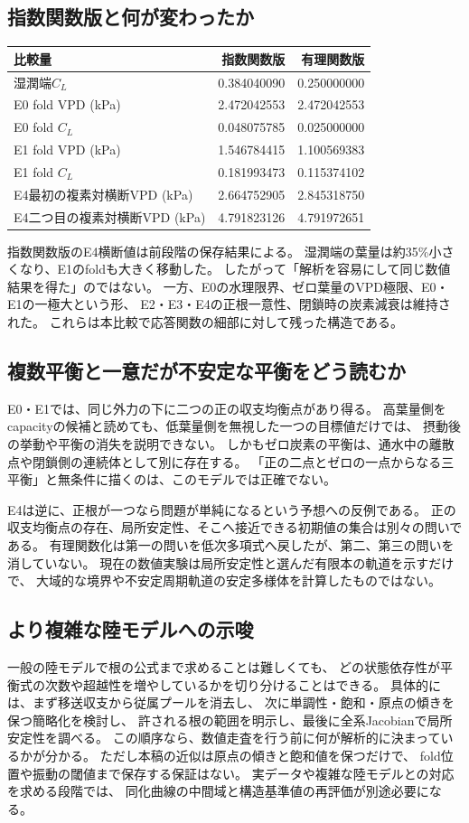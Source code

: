 \documentclass[a4paper,11pt]{ltjsarticle}
\begin{document}
\subsection{指数関数版と何が変わったか}
\begin{center}\small
\begin{tabular}{l r r}\toprule
比較量&指数関数版&有理関数版\\\midrule
湿潤端$C_L$&0.384040090&0.250000000\\
E0 fold VPD (kPa)&2.472042553&2.472042553\\
E0 fold $C_L$&0.048075785&0.025000000\\
E1 fold VPD (kPa)&1.546784415&1.100569383\\
E1 fold $C_L$&0.181993473&0.115374102\\
E4最初の複素対横断VPD (kPa)&2.664752905&2.845318750\\
E4二つ目の複素対横断VPD (kPa)&4.791823126&4.791972651\\
\bottomrule\end{tabular}
\end{center}
指数関数版のE4横断値は前段階の保存結果による。
湿潤端の葉量は約35\%小さくなり、E1のfoldも大きく移動した。
したがって「解析を容易にして同じ数値結果を得た」のではない。
一方、E0の水理限界、ゼロ葉量のVPD極限、E0・E1の一極大という形、
E2・E3・E4の正根一意性、閉鎖時の炭素減衰は維持された。
これらは本比較で応答関数の細部に対して残った構造である。

\subsection{複数平衡と一意だが不安定な平衡をどう読むか}
E0・E1では、同じ外力の下に二つの正の収支均衡点があり得る。
高葉量側をcapacityの候補と読めても、低葉量側を無視した一つの目標値だけでは、
摂動後の挙動や平衡の消失を説明できない。
しかもゼロ炭素の平衡は、通水中の離散点や閉鎖側の連続体として別に存在する。
「正の二点とゼロの一点からなる三平衡」と無条件に描くのは、このモデルでは正確でない。

E4は逆に、正根が一つなら問題が単純になるという予想への反例である。
正の収支均衡点の存在、局所安定性、そこへ接近できる初期値の集合は別々の問いである。
有理関数化は第一の問いを低次多項式へ戻したが、第二、第三の問いを消していない。
現在の数値実験は局所安定性と選んだ有限本の軌道を示すだけで、
大域的な境界や不安定周期軌道の安定多様体を計算したものではない。

\subsection{より複雑な陸モデルへの示唆}
一般の陸モデルで根の公式まで求めることは難しくても、
どの状態依存性が平衡式の次数や超越性を増やしているかを切り分けることはできる。
具体的には、まず移送収支から従属プールを消去し、
次に単調性・飽和・原点の傾きを保つ簡略化を検討し、
許される根の範囲を明示し、最後に全系Jacobianで局所安定性を調べる。
この順序なら、数値走査を行う前に何が解析的に決まっているかが分かる。
ただし本稿の近似は原点の傾きと飽和値を保つだけで、
fold位置や振動の閾値まで保存する保証はない。
実データや複雑な陸モデルとの対応を求める段階では、
同化曲線の中間域と構造基準値の再評価が別途必要になる。
\end{document}
